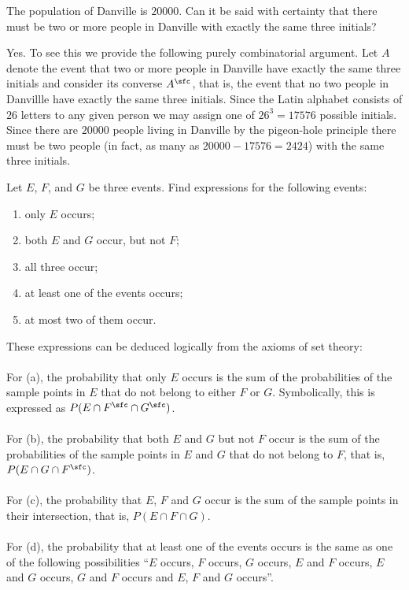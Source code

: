 \begin{problem}[DasGupta, 1.5]
  The population of Danville is \(20000\). Can it be said with certainty
  that there must be two or more people in Danville with exactly the same
  three initials?
\end{problem}
\begin{solution}
  Yes. To see this we provide the following purely combinatorial
  argument. Let \(A\) denote the event that two or more people in Danville
  have exactly the same three initials and consider its converse
  \(A^\sfc\), that is, the event that no two people in Danvillle have
  exactly the same three initials. Since the Latin alphabet consists of
  \(26\) letters to any given person we may assign one of \(26^3=17576\)
  possible initials. Since there are \(20000\) people living in Danville by
  the pigeon-hole principle there must be two people (in fact, as many as
  \(20000-17576=2424\)) with the same three initials.
\end{solution}
\newpage

\begin{problem}[DasGupta, 1.7]
  Let \(E\), \(F\), and \(G\) be three events. Find expressions for the
  following events:
  \begin{enumerate}[label=(\alph*),noitemsep]
  \item only \(E\) occurs;
  \item both \(E\) and \(G\) occur, but not \(F\);
  \item all three occur;
  \item at least one of the events occurs;
  \item at most two of them occur.
  \end{enumerate}
\end{problem}
\begin{solution}
  These expressions can be deduced logically from the axioms of set theory:
  \\\\
  For (a), the probability that only \(E\) occurs is the sum of the
  probabilities of the sample points in \(E\) that do not belong to either
  \(F\) or \(G\). Symbolically, this is expressed as
  \(P(E\cap F^\sfc\cap G^\sfc)\).
  \\\\
  For (b), the probability that both \(E\) and \(G\) but not \(F\) occur is
  the sum of the probabilities of the sample points in \(E\) and \(G\) that
  do not belong to \(F\), that is, \(P(E\cap G\cap F^\sfc)\).
  \\\\
  For (c), the probability that \(E\), \(F\) and \(G\) occur is the sum of
  the sample points in their intersection, that is, \(P(E\cap F\cap G)\).
  \\\\
  For (d), the probability that at least one of the events occurs is the
  same as one of the following possibilities ``\(E\) occurs, \(F\) occurs,
  \(G\) occurs, \(E\) and \(F\) occurs, \(E\) and \(G\) occurs, \(G\) and
  \(F\) occurs and \(E\), \(F\) and \(G\) occurs''.
\end{solution}
\newpage

